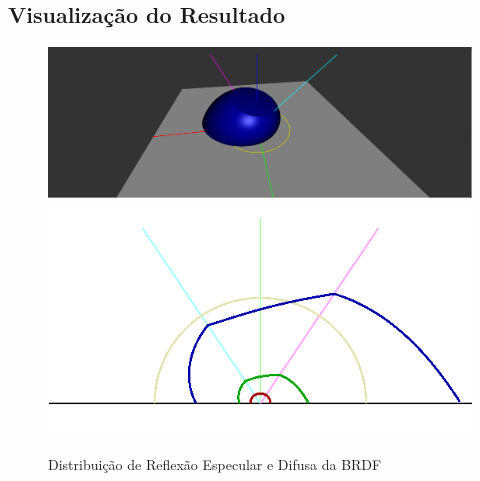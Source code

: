 \subsection{Visualização do Resultado}
\begin{figure}[H]
    \caption{\small{Distribuição de Reflexão Especular e Difusa da BRDF}}\label{fig-ashikhmin-shirley-alternative-eqlang}
    \vspace{42px}
  \includegraphics[width=\linewidth]{./Imagens/brdfs/ashikhmin-shirley-alternative-3D-plot}
\endminipage\hfill
{}
  \includegraphics[width=\linewidth]{./Imagens/brdfs/ashikhmin-shirley-alternative-polar-plot.png}
\endminipage\hfill
\end{figure}

